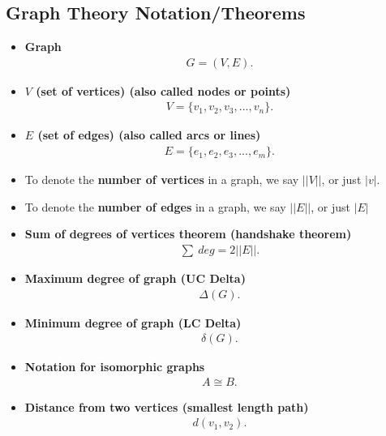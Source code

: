 \documentclass{report}
\begin{document}
      \subsection{Graph Theory Notation/Theorems}
      \bigbreak \noindent 
      \begin{itemize}
        \item \textbf{Graph}
          \begin{align*}
            G = (V,E)
          .\end{align*}
        \item \textbf{$V$ (set of vertices) (also called nodes or points)}
          \begin{align*}
            V = \{v_{1}, v_{2}, v_{3},...,v_{n}\}
          .\end{align*}
        \item \textbf{$E$ (set of edges) (also called arcs or lines)}
          \begin{align*}
            E = \{e_{1}, e_{2}, e_{3},...,e_{m}\}
          .\end{align*}
      \item To denote the \textbf{number of vertices} in a graph, we say $||V||$, or just $|v|$. 
      \item  To denote the \textbf{number of edges} in a graph, we say $||E||$, or just $|E|$
      \item \textbf{Sum of degrees of vertices theorem (handshake theorem)}
         \begin{align*}
           \sum\ deg = 2||E||
       .\end{align*} 
      \item \textbf{Maximum degree of graph (UC Delta)}
        \begin{align*}
          \Delta(G)
        .\end{align*}
          \item \textbf{Minimum degree of graph (LC Delta)}
        \begin{align*}
          \delta(G)
        .\end{align*}
      \item \textbf{Notation for isomorphic graphs}
        \begin{align*}
          A \cong B
        .\end{align*}
      \item \textbf{Distance from two vertices (smallest length path)}
        \begin{align*}
          d(v_{1},v_{2})
        .\end{align*}

\end{itemize}
\end{document}
